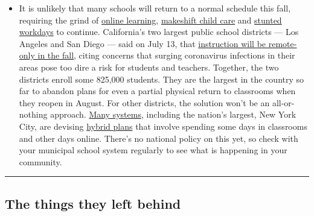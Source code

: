 \begin{itemize}
  \begin{itemize}
  \tightlist
  \item
    It is unlikely that many schools will return to a normal schedule
    this fall, requiring the grind of
    \href{https://www.nytimes.com/2020/06/05/us/coronavirus-education-lost-learning.html?action=click\&pgtype=Article\&state=default\&region=MAIN_CONTENT_3\&context=storylines_faq}{online
    learning},
    \href{https://www.nytimes.com/2020/05/29/us/coronavirus-child-care-centers.html?action=click\&pgtype=Article\&state=default\&region=MAIN_CONTENT_3\&context=storylines_faq}{makeshift
    child care} and
    \href{https://www.nytimes.com/2020/06/03/business/economy/coronavirus-working-women.html?action=click\&pgtype=Article\&state=default\&region=MAIN_CONTENT_3\&context=storylines_faq}{stunted
    workdays} to continue. California's two largest public school
    districts --- Los Angeles and San Diego --- said on July 13, that
    \href{https://www.nytimes.com/2020/07/13/us/lausd-san-diego-school-reopening.html?action=click\&pgtype=Article\&state=default\&region=MAIN_CONTENT_3\&context=storylines_faq}{instruction
    will be remote-only in the fall}, citing concerns that surging
    coronavirus infections in their areas pose too dire a risk for
    students and teachers. Together, the two districts enroll some
    825,000 students. They are the largest in the country so far to
    abandon plans for even a partial physical return to classrooms when
    they reopen in August. For other districts, the solution won't be an
    all-or-nothing approach.
    \href{https://bioethics.jhu.edu/research-and-outreach/projects/eschool-initiative/school-policy-tracker/}{Many
    systems}, including the nation's largest, New York City, are
    devising
    \href{https://www.nytimes.com/2020/06/26/us/coronavirus-schools-reopen-fall.html?action=click\&pgtype=Article\&state=default\&region=MAIN_CONTENT_3\&context=storylines_faq}{hybrid
    plans} that involve spending some days in classrooms and other days
    online. There's no national policy on this yet, so check with your
    municipal school system regularly to see what is happening in your
    community.
  \end{itemize}
\end{itemize}

\begin{center}\rule{0.5\linewidth}{\linethickness}\end{center}

\hypertarget{the-things-they-left-behind}{%
\subsection{The things they left
behind}\label{the-things-they-left-behind}}

